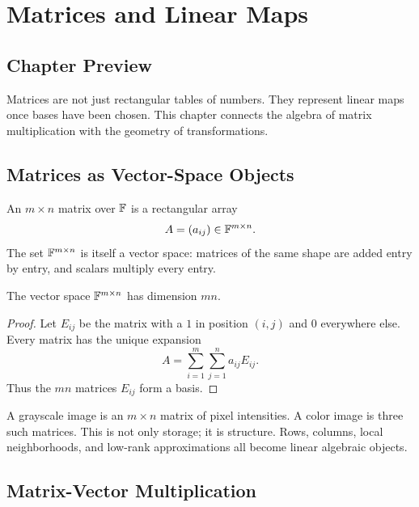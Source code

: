 \chapter{Matrices and Linear Maps}
\label{ch:matrices-linear-maps}

\section*{Chapter Preview}

Matrices are not just rectangular tables of numbers. They represent linear
maps once bases have been chosen. This chapter connects the algebra of matrix
multiplication with the geometry of transformations.

\section{Matrices as Vector-Space Objects}

An $m\times n$ matrix over $\mathbb{F}$ is a rectangular array
\[
  A=(a_{ij})\in\mathbb{F}^{m\times n}.
\]
The set $\mathbb{F}^{m\times n}$ is itself a vector space: matrices of the same shape
are added entry by entry, and scalars multiply every entry.

\begin{proposition}
The vector space $\mathbb{F}^{m\times n}$ has dimension $mn$.
\end{proposition}

\begin{proof}
Let $E_{ij}$ be the matrix with a $1$ in position $(i,j)$ and $0$ everywhere
else. Every matrix has the unique expansion
\[
  A=\sum_{i=1}^m\sum_{j=1}^n a_{ij}E_{ij}.
\]
Thus the $mn$ matrices $E_{ij}$ form a basis.
\end{proof}

\begin{aimlbox}
A grayscale image is an $m\times n$ matrix of pixel intensities. A color image
is three such matrices. This is not only storage; it is structure. Rows,
columns, local neighborhoods, and low-rank approximations all become linear
algebraic objects.
\end{aimlbox}

\section{Matrix-Vector Multiplication}


